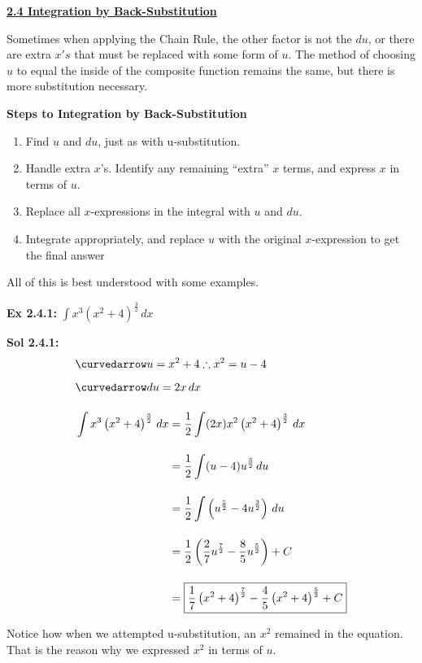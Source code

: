 \textbf{\underline{\large{2.4 Integration by Back-Substitution}}} \par

Sometimes when applying the Chain Rule, the other factor is not the $du$, or there are extra $x's$ that must be replaced with some form of $u$. The method of choosing $u$ to equal the inside of the composite function remains the same, but there is more substitution necessary. \par

\textbf{Steps to Integration by Back-Substitution} \par

\begin{enumerate}
    \item Find $u$ and $du$, just as with u-substitution.
    \item Handle extra $x$'s. Identify any remaining ``extra'' $x$ terms, and express $x$ in terms of $u$.
    \item Replace all $x$-expressions in the integral with $u$ and $du$.
    \item Integrate appropriately, and replace $u$ with the original $x$-expression to get the final answer
\end{enumerate} \vspace{11pt}

All of this is best understood with some examples.

\begin{tcolorbox}[example]
    \textbf{Ex 2.4.1: } $\int x^3\left(x^2 + 4\right)^{\frac{3}{2}} \, dx$
\end{tcolorbox}
\begin{tcolorbox}[solution]
    \textbf{Sol 2.4.1: } \begin{align*}
        & \curvedarrow u = x^2 + 4 \therefore x^2 = u - 4 \\[5.5pt]
        & \curvedarrow du = 2x \, dx \\[11pt]
        & \int x^3\left(x^2 + 4\right)^{\frac{3}{2}} \, dx \begin{aligned}[t]
            & = \dfrac{1}{2} \int (2x)x^2\left(x^2 + 4\right)^{\frac{3}{2}} \, dx \\[11pt]
            & = \dfrac{1}{2} \int (u - 4)u^{\frac{3}{2}} \, du \\[11pt]
            & = \dfrac{1}{2} \int \left(u^{\frac{5}{2}} - 4u^{\frac{3}{2}}\right) \, du \\[11pt]
            & = \dfrac{1}{2} \left(\dfrac{2}{7}u^{\frac{7}{2}} - \dfrac{8}{5}u^{\frac{5}{2}}\right) + C \\[11pt]
            & = \boxed{\dfrac{1}{7}\left(x^2 + 4\right)^{\frac{7}{2}} - \dfrac{4}{5}\left(x^2 + 4\right)^{\frac{5}{2}} + C}
        \end{aligned}
    \end{align*}

    Notice how when we attempted u-substitution, an $x^2$ remained in the equation. That is the reason why we expressed $x^2$ in terms of $u$.
\end{tcolorbox} \vspace{11pt}

